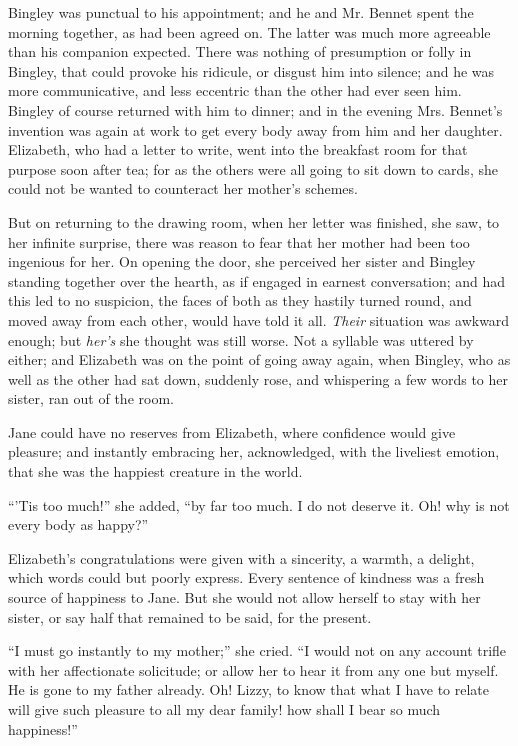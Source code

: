 Bingley was punctual to his appointment; and he and
Mr. Bennet spent the morning together, as had been agreed
on. The latter was much more agreeable than his companion
expected. There was nothing of presumption or
folly in Bingley, that could provoke his ridicule, or disgust
him into silence; and he was more communicative, and
less eccentric than the other had ever seen him. Bingley
of course returned with him to dinner; and in the evening
Mrs. Bennet’s invention was again at work to get every
body away from him and her daughter. Elizabeth, who
had a letter to write, went into the breakfast room for
that purpose soon after tea; for as the others were all
going to sit down to cards, she could not be wanted to
counteract her mother’s schemes.

But on returning to the drawing room, when her letter
was finished, she saw, to her infinite surprise, there was
reason to fear that her mother had been too ingenious for
her. On opening the door, she perceived her sister and
Bingley standing together over the hearth, as if engaged in
earnest conversation; and had this led to no suspicion,
the faces of both as they hastily turned round, and moved
away from each other, would have told it all. \textit{Their}
situation was awkward enough; but \textit{her’s} she thought was
still worse. Not a syllable was uttered by either; and Elizabeth
was on the point of going away again, when Bingley,
who as well as the other had sat down, suddenly rose, and
whispering a few words to her sister, ran out of the room.

Jane could have no reserves from Elizabeth, where
confidence would give pleasure; and instantly embracing
her, acknowledged, with the liveliest emotion, that she
was the happiest creature in the world.

“’Tis too much!” she added, “by far too much. I do
not deserve it. Oh! why is not every body as happy?”

Elizabeth’s congratulations were given with a sincerity,
a warmth, a delight, which words could but poorly express.
Every sentence of kindness was a fresh source of happiness
to Jane. But she would not allow herself to stay with her
sister, or say half that remained to be said, for the present.

“I must go instantly to my mother;” she cried.
“I would not on any account trifle with her affectionate
solicitude; or allow her to hear it from any one but myself.
He is gone to my father already. Oh! Lizzy, to know
that what I have to relate will give such pleasure to all
my dear family! how shall I bear so much happiness!”

